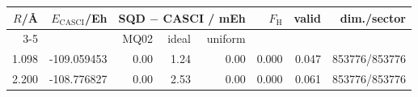 \begin{tabular}{rrrrrrrr}
\toprule
$R$/\AA & $E_\mathrm{CASCI}$/Eh & \multicolumn{3}{c}{SQD $-$ CASCI / mEh} & $F_\mathrm{H}$ & valid & dim./sector \\
\cmidrule(lr){3-5}
 & & MQ02 & ideal & uniform & & & \\
\midrule
1.098 & -109.059453 & 0.00 & 1.24 & 0.00 & 0.000 & 0.047 & 853776/853776 \\
2.200 & -108.776827 & 0.00 & 2.53 & 0.00 & 0.000 & 0.061 & 853776/853776 \\
\bottomrule
\end{tabular}
